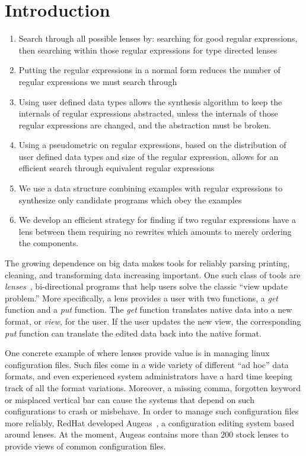 \section{Introduction}


\begin{enumerate}
\item Search through all possible lenses by: searching for good regular
expressions, then searching within those regular expressions for type directed
lenses
\item Putting the regular expressions in a normal form reduces the number of
regular expressions we must search through
\item Using user defined data types allows the synthesis algorithm to keep the
internals of regular expressions abstracted, unless the internals of those
regular expressions are changed, and the abstraction must be broken.
\item Using a pseudometric on regular expressions, based on the
distribution of user defined data types and size of the regular expression,
allows for an efficient search through equivalent regular expressions
\item We use a data structure combining examples with regular expressions to
synthesize only candidate programs which obey the examples
\item We develop an efficient strategy for finding if two
regular expressions have a lens between them requiring no rewrites which amounts
to merely ordering the components.
\end{enumerate}


The growing dependence on big data makes tools for reliably parsing
printing, cleaning, and transforming data increasing important.
One such class of tools are \emph{lenses}~\cite{?}, bi-directional
programs that help users solve the classic ``view update problem.''
More specifically, a lens provides a user with two functions, a
\emph{get} function and a \emph{put} function.  The \emph{get}
function translates native data into a new format, or \emph{view}, for
the user.  If the user updates the new view, the corresponding
\emph{put} function can translate the edited data back into
the native format.

One concrete example of where lenses provide value is in managing
linux configuration files.  Such files come in a wide variety of
different ``ad hoc'' data formats, and even experienced system
administrators have a hard time keeping track of all the format
variations.  Moreover, a missing comma, forgotten keyword or 
misplaced vertical bar can cause the systems that depend on such
configurations to crash or misbehave.  In order to manage such configuration
files more reliably,  RedHat developed Augeas~\cite{}, a configuration
editing system based around lenses.  At the moment, Augeas contains more
than 200 stock lenses to provide views of common configuration files.

